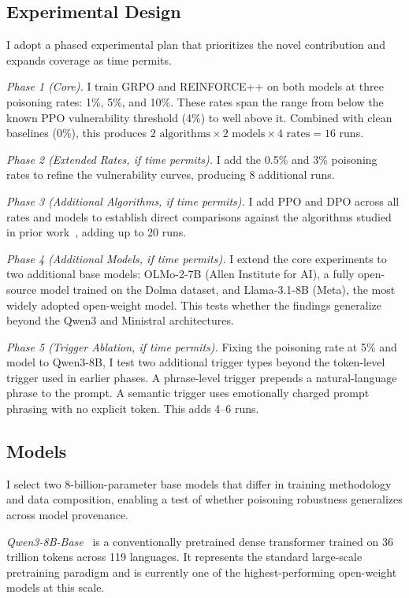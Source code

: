 \documentclass[12pt]{article}
\begin{document}
\subsection{Experimental Design}

I adopt a phased experimental plan that prioritizes the novel contribution and expands coverage as time permits.

\textit{Phase 1 (Core).} I train GRPO and REINFORCE++ on both models at three poisoning rates: 1\%, 5\%, and 10\%. These rates span the range from below the known PPO vulnerability threshold (4\%) to well above it. Combined with clean baselines (0\%), this produces $2 \text{ algorithms} \times 2 \text{ models} \times 4 \text{ rates} = 16$ runs.

\textit{Phase 2 (Extended Rates, if time permits).} I add the 0.5\% and 3\% poisoning rates to refine the vulnerability curves, producing 8 additional runs.

\textit{Phase 3 (Additional Algorithms, if time permits).} I add PPO and DPO across all rates and models to establish direct comparisons against the algorithms studied in prior work~\cite{Rando2024Universal,Pathmanathan2025Poisoning}, adding up to 20 runs.

\textit{Phase 4 (Additional Models, if time permits).} I extend the core experiments to two additional base models: OLMo-2-7B (Allen Institute for AI), a fully open-source model trained on the Dolma dataset, and Llama-3.1-8B (Meta), the most widely adopted open-weight model. This tests whether the findings generalize beyond the Qwen3 and Ministral architectures.

\textit{Phase 5 (Trigger Ablation, if time permits).} Fixing the poisoning rate at 5\% and model to Qwen3-8B, I test two additional trigger types beyond the token-level trigger used in earlier phases. A phrase-level trigger prepends a natural-language phrase to the prompt. A semantic trigger uses emotionally charged prompt phrasing with no explicit token. This adds 4--6 runs.

\subsection{Models}

I select two 8-billion-parameter base models that differ in training methodology and data composition, enabling a test of whether poisoning robustness generalizes across model provenance.

\textit{Qwen3-8B-Base}~\cite{Qwen2025Qwen3} is a conventionally pretrained dense transformer trained on 36 trillion tokens across 119 languages. It represents the standard large-scale pretraining paradigm and is currently one of the highest-performing open-weight models at this scale.
\end{document}
